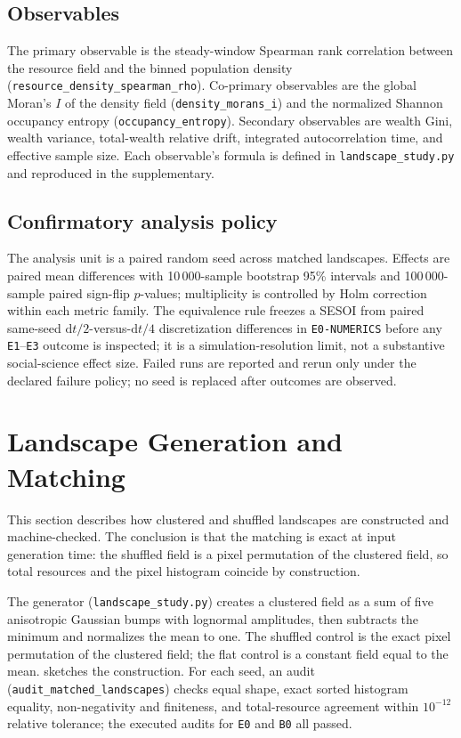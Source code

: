 \documentclass[11pt,a4paper]{article}
\newcommand{\code}[1]{\texttt{#1}}
\begin{document}
\subsection{Observables}

The primary observable is the steady-window Spearman rank correlation between
the resource field and the binned population density
(\code{resource\_density\_spearman\_rho}). Co-primary observables are the
global Moran's $I$ of the density field (\code{density\_morans\_i}) and the
normalized Shannon occupancy entropy (\code{occupancy\_entropy}). Secondary
observables are wealth Gini, wealth variance, total-wealth relative drift,
integrated autocorrelation time, and effective sample size. Each observable's
formula is defined in \code{landscape\_study.py} and reproduced in the
supplementary.

\subsection{Confirmatory analysis policy}

The analysis unit is a paired random seed across matched landscapes. Effects
are paired mean differences with 10\,000-sample bootstrap 95\% intervals and
100\,000-sample paired sign-flip $p$-values; multiplicity is controlled by Holm
correction within each metric family. The equivalence rule freezes a SESOI from
paired same-seed $\mathrm{d}t/2$-versus-$\mathrm{d}t/4$ discretization
differences in \code{E0-NUMERICS} before any \code{E1}--\code{E3} outcome is
inspected; it is a simulation-resolution limit, not a substantive social-science
effect size. Failed runs are reported and rerun only under the declared failure
policy; no seed is replaced after outcomes are observed.

\section{Landscape Generation and Matching}
\label{sec:landscapes}

This section describes how clustered and shuffled landscapes are constructed and
machine-checked. The conclusion is that the matching is exact at input
generation time: the shuffled field is a pixel permutation of the clustered
field, so total resources and the pixel histogram coincide by construction.

The generator (\code{landscape\_study.py}) creates a clustered field as a sum
of five anisotropic Gaussian bumps with lognormal amplitudes, then subtracts
the minimum and normalizes the mean to one. The shuffled control is the exact
pixel permutation of the clustered field; the flat control is a constant field
equal to the mean.  sketches the construction. For each seed,
an audit (\code{audit\_matched\_landscapes}) checks equal shape, exact sorted
histogram equality, non-negativity and finiteness, and total-resource agreement
within $10^{-12}$ relative tolerance; the executed audits for \code{E0} and
\code{B0} all passed.
\end{document}
